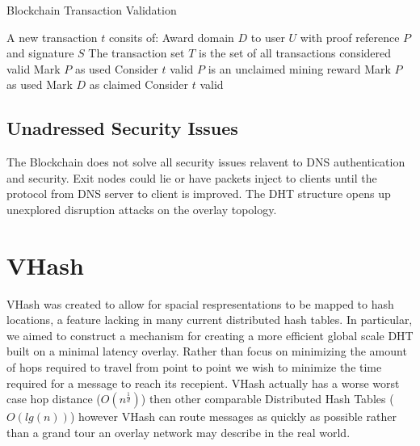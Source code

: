 \documentclass[11pt]{IEEEtran} %
\begin{document}
\begin{algorithm}
\caption{Blockchain Transaction Validation}
\label{mining}
\begin{algorithmic}[1]  %
\STATE A new transaction $t$ consits of: Award domain $D$ to user $U$ with proof reference $P$ and signature $S$
\STATE The transaction set $T$ is the set of all transactions considered valid
    		\STATE Mark $P$ as used
            \STATE Consider $t$ valid
        \ELSE
            	\STATE $P$ is an unclaimed mining reward
                	\STATE Mark $P$ as used
                    \STATE Mark $D$ as claimed
                    \STATE Consider $t$ valid
                \ENDIF
			\ENDIF
         \ENDIF
    \ENDIF
\ENDIF
\end{algorithmic}
\end{algorithm}




\subsection{Unadressed Security Issues}
The Blockchain does not solve all security issues relavent to DNS authentication and security. Exit nodes could lie or have packets inject to clients until the protocol from DNS server to client is improved. The DHT structure opens up unexplored disruption attacks on the overlay topology.



\section{VHash}
VHash was created to allow for spacial respresentations to be mapped to hash locations, a feature lacking in many current distributed hash tables.  In particular, we aimed to construct a mechanism for creating a more efficient global scale DHT built on a minimal latency overlay. Rather than focus on minimizing the amount of hops required to travel from point to point we wish to minimize the time required for a message to reach its recepient. VHash actually has a worse worst case hop distance ($O(n^{\frac{1}{d}})$) then other comparable Distributed Hash Tables ($O(lg(n))$) however VHash can route messages as quickly as possible rather than a grand tour an overlay network may describe in the real world.
\end{document}
